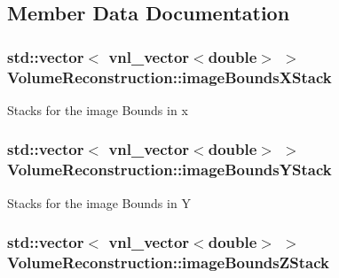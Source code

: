 \subsection{Member Data Documentation}
\hypertarget{class_volume_reconstruction_a96b8325b93561329706e8fa152b31568}{
\subsubsection[{image\-Bounds\-X\-Stack}]{\setlength{\rightskip}{0pt plus 5cm}std\-::vector$<$ vnl\-\_\-vector$<$double$>$ $>$ {\bf Volume\-Reconstruction\-::image\-Bounds\-X\-Stack}}}\label{d0/d82/class_volume_reconstruction_a96b8325b93561329706e8fa152b31568}
Stacks for the image Bounds in x \hypertarget{class_volume_reconstruction_a4e8c38f1168e4b35c026af2700f3aabc}{
\subsubsection[{image\-Bounds\-Y\-Stack}]{\setlength{\rightskip}{0pt plus 5cm}std\-::vector$<$ vnl\-\_\-vector$<$double$>$ $>$ {\bf Volume\-Reconstruction\-::image\-Bounds\-Y\-Stack}}}\label{d0/d82/class_volume_reconstruction_a4e8c38f1168e4b35c026af2700f3aabc}
Stacks for the image Bounds in Y \hypertarget{class_volume_reconstruction_a00e60d5e0d604279caabe68c4ebc8fda}{
\subsubsection[{image\-Bounds\-Z\-Stack}]{\setlength{\rightskip}{0pt plus 5cm}std\-::vector$<$ vnl\-\_\-vector$<$double$>$ $>$ {\bf Volume\-Reconstruction\-::image\-Bounds\-Z\-Stack}}}\label{d0/d82/class_volume_reconstruction_a00e60d5e0d604279caabe68c4ebc8fda}
